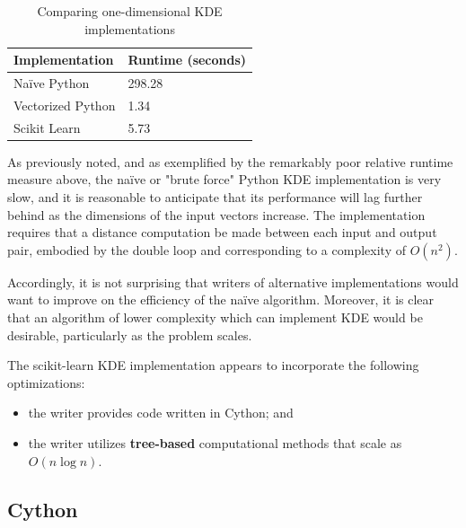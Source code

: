 \documentclass[11pt]{article}
\begin{document}


\begin{table}[h!]
\centering
\begin{tabular}{@{}ll@{}}
\toprule
Implementation			& Runtime (seconds)       	\\
\midrule
Na\"ive Python			& 298.28				\\
Vectorized Python		& 1.34				\\
Scikit Learn			& 5.73				\\
\bottomrule
\end{tabular}
\caption{Comparing one-dimensional KDE implementations}
\label{compare_kde}
\end{table}

\noindent
As previously noted, and as exemplified by the remarkably poor relative runtime measure above, the na\"ive or "brute force" Python KDE implementation is very slow, and it is reasonable to anticipate that its performance will lag further behind as the dimensions of the input vectors increase. The implementation requires that a distance computation be made between each input and output pair, embodied by the double loop and corresponding to a complexity of $O(n^2)$. \medskip

\noindent
Accordingly, it is not surprising that writers of alternative implementations would want to improve on the efficiency of the na\"ive algorithm. Moreover, it is clear that an algorithm of lower complexity which can implement KDE would be desirable, particularly as the problem scales. \medskip

\noindent The scikit-learn KDE implementation appears to incorporate the following optimizations:

\begin{itemize}

\item the writer provides code written in Cython; and
\item the writer utilizes \textbf{tree-based} computational methods that scale as $O(n \log n)$.

\end{itemize}

\subsection{Cython}
\end{document}

